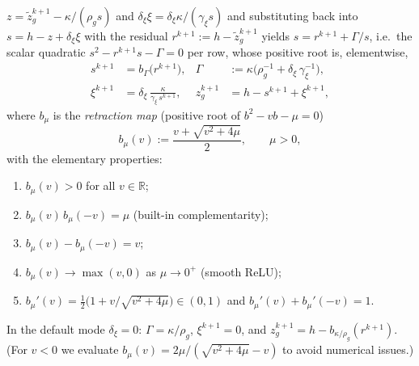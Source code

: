 \documentclass[10pt,twocolumn]{article}
\newcommand{\R}{\mathbb{R}}
\newcommand{\half}{\tfrac{1}{2}}
\begin{document}
$z = \tilde z_g^{k+1} - \kappa/(\rho_g s)$ and
$\delta_\xi\xi = \delta_\xi\kappa/(\gamma_\xi s)$ and substituting back into
$s = h - z + \delta_\xi\xi$ with the residual $r^{k+1} := h - \tilde z_g^{k+1}$
yields $s = r^{k+1} + \Gamma/s$, i.e.\ the scalar quadratic
$s^2 - r^{k+1}s - \Gamma = 0$ per row, whose positive root is, elementwise,
\begin{equation}
\label{eq:retr-update}
\boxed{
\begin{aligned}
s^{k+1} &= b_\Gamma\bigl(r^{k+1}\bigr),
& \Gamma &:= \kappa\bigl(\rho_g^{-1} + \delta_\xi\,\gamma_\xi^{-1}\bigr),\\
\xi^{k+1} &= \delta_\xi\,\frac{\kappa}{\gamma_\xi\, s^{k+1}},
& z_g^{k+1} &= h - s^{k+1} + \xi^{k+1},
\end{aligned}}
\end{equation}
where $b_\mu$ is the \emph{retraction map} (positive root of $b^2 - vb - \mu = 0$)
\begin{equation}
\label{eq:b}
b_\mu(v) := \frac{v + \sqrt{v^2 + 4\mu}}{2}, \qquad \mu > 0,
\end{equation}
with the elementary properties:
\begin{enumerate}[nosep,leftmargin=2.2em,label=(\roman*)]
\item $b_\mu(v) > 0$ for all $v\in\R$;
\item $b_\mu(v)\,b_\mu(-v) = \mu$ (built-in complementarity);
\item $b_\mu(v) - b_\mu(-v) = v$;
\item $b_\mu(v)\to\max(v,0)$ as $\mu\to 0^+$ (smooth ReLU);
\item $b_\mu'(v) = \half\bigl(1+v/\sqrt{v^2+4\mu}\bigr)\in(0,1)$ and
  $b_\mu'(v) + b_\mu'(-v) = 1$.
\end{enumerate}
In the default mode $\delta_\xi = 0$: $\Gamma = \kappa/\rho_g$, $\xi^{k+1} = 0$, and
$z_g^{k+1} = h - b_{\kappa/\rho_g}(r^{k+1})$. (For $v<0$ we evaluate
$b_\mu(v) = 2\mu/(\sqrt{v^2+4\mu}-v)$ to avoid numerical issues.)
\end{document}
